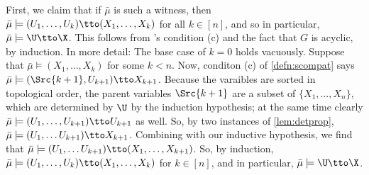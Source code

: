 \begin{subappendices}
\begin{lproof}
    First, we claim that if $\bar\mu$ is such a witness, then 
    $\bar\mu \models (U_1, \ldots, U_k) \tto (X_1, \ldots, X_k)$
    for all $k \in [n]$, and so in particular, $\bar\mu \models \U \tto \X$. 
    This follows from \scibility's condition (c) and the fact that $G$ is acyclic, by induction.
    In more detail:
    The base case of $k=0$ holds vacuously.
    Suppose that $\bar\mu \models (X_1, \ldots, X_k)$ for some $k < n$. 
    Now, conditon (c) of \cref{defn:scompat} says 
    $\bar\mu  \models (\Src {k+1}, U_{k+1}) \tto X_{k+1}$. 
    Because the varaibles are sorted in topological order, the parent variables $\Src {k+1}$ are a subset of $\{X_1, \ldots, X_n\}$, which are determined by $\U$ by the induction hypothesis;
    at the same time clearly $\bar\mu \models (U_1, \ldots, U_{k+1}) \tto U_{k+1}$  as well. 
    So, by two instances of \cref{lem:detprop}, 
        $\bar\mu \models (U_1, \ldots U_{k+1}) \tto X_{k+1}$.
    Combining with our inductive hypothesis, we find that
        $\bar\mu \models (U_1, \ldots U_{k+1}) \tto (X_1, \ldots, X_{k+1})$.
    So, by induction, 
    $\bar\mu \models (U_1, \ldots, U_k) \tto (X_1, \ldots, X_k)$
    for $k \in [n]$, and in particular, $\bar\mu \models \U \tto \X$.
    


\end{lproof}
\end{subappendices}

